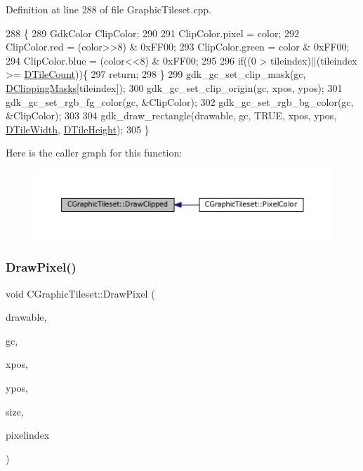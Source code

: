 Definition at line 288 of file Graphic\+Tileset.\+cpp.


\begin{DoxyCode}
288                                                                                                            
                \{
289     GdkColor ClipColor;
290     
291     ClipColor.pixel = color;
292     ClipColor.red = (color>>8) & 0xFF00;
293     ClipColor.green = color & 0xFF00;
294     ClipColor.blue = (color<<8) & 0xFF00;
295     
296     \textcolor{keywordflow}{if}((0 > tileindex)||(tileindex >= \hyperlink{classCGraphicTileset_a39d942b370e47f441bf97385eb1037c8}{DTileCount}))\{
297         \textcolor{keywordflow}{return};
298     \}
299     gdk\_gc\_set\_clip\_mask(gc, \hyperlink{classCGraphicTileset_a3761aec1b9a8bf189da5a7202d7fcac9}{DClippingMasks}[tileindex]);
300     gdk\_gc\_set\_clip\_origin(gc, xpos, ypos);
301     gdk\_gc\_set\_rgb\_fg\_color(gc, &ClipColor);
302     gdk\_gc\_set\_rgb\_bg\_color(gc, &ClipColor);
303     
304     gdk\_draw\_rectangle(drawable, gc, TRUE, xpos, ypos, \hyperlink{classCGraphicTileset_a2d0c7d19865b81911a3a43d5cae50e00}{DTileWidth}, 
      \hyperlink{classCGraphicTileset_af48f32e07d5fe69afd5f764318cc3244}{DTileHeight});
305 \}
\end{DoxyCode}
Here is the caller graph for this function\+:\nopagebreak
\begin{figure}[H]
\begin{center}
\leavevmode
\includegraphics[width=350pt]{classCGraphicTileset_a104935351be4c465f3ff08c111455d19_icgraph}
\end{center}
\end{figure}
\hypertarget{classCGraphicTileset_a8acad7ebeb4fad53a72681851f323812}{}\label{classCGraphicTileset_a8acad7ebeb4fad53a72681851f323812} 
\subsubsection{\texorpdfstring{Draw\+Pixel()}{DrawPixel()}}
{\footnotesize\ttfamily void C\+Graphic\+Tileset\+::\+Draw\+Pixel (\begin{DoxyParamCaption}\item[{Gdk\+Drawable $\ast$}]{drawable,  }\item[{Gdk\+GC $\ast$}]{gc,  }\item[{gint}]{xpos,  }\item[{gint}]{ypos,  }\item[{int}]{size,  }\item[{int}]{pixelindex }\end{DoxyParamCaption})}



